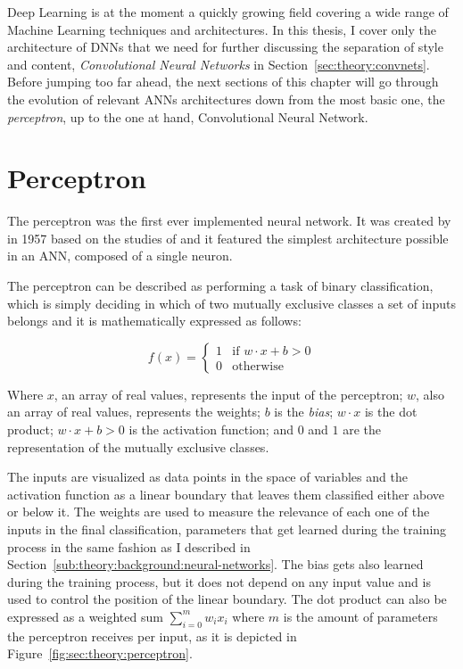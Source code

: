 Deep Learning is at the moment a quickly growing field covering a wide range of Machine Learning techniques and architectures.
In this thesis, I cover only the architecture of DNNs that we need for further discussing the separation of style and content, \emph{Convolutional Neural Networks} in Section~\ref{sec:theory:convnets}.
Before jumping too far ahead, the next sections of this chapter will go through the evolution of relevant ANNs architectures down from the most basic one, the \emph{perceptron}, up to the one at hand, Convolutional Neural Network.



\section{Perceptron}
\label{sec:theory:perceptron}

The perceptron was the first ever implemented neural network.
It was created by \citet{Rosenblatt1958} in 1957 based on the studies of \citet{McCulloch1943} and it featured the simplest architecture possible in an ANN, composed of a single neuron.

The perceptron can be described as performing a task of binary classification, which is simply deciding in which of two mutually exclusive classes a set of inputs belongs \cite{Freund1999} and it is mathematically expressed as follows:

$$
  f(x) =
  \begin{cases}
    1 & \text{if } {w}\cdot{x}+b > 0\\
    0 & \text{otherwise}
  \end{cases}
$$

Where $x$, an array of real values, represents the input of the perceptron; $w$, also an array of real values, represents the weights; $b$ is the \emph{bias}; ${w}\cdot{x}$ is the dot product; ${w}\cdot{x}+b > 0$ is the activation function; and $0$ and $1$ are the representation of the mutually exclusive classes.

The inputs are visualized as data points in the space of variables and the activation function as a linear boundary that leaves them classified either above or below it.
The weights are used to measure the relevance of each one of the inputs in the final classification, parameters that get learned during the training process in the same fashion as I described in Section~\ref{sub:theory:background:neural-networks}.
The bias gets also learned during the training process, but it does not depend on any input value and is used to control the position of the linear boundary.
The dot product can also be expressed as a weighted sum $\sum_{i=0}^{m} w_i x_i$ where $m$ is the amount of parameters the perceptron receives per input, as it is depicted in Figure~\ref{fig:sec:theory:perceptron}.

